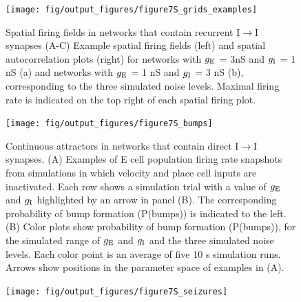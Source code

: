 \documentclass[a4paper,12pt]{article}
\newcommand{\ssc}[3]{\ensuremath{#1_{\text{#2}_{\text{#3}}}}}
\newcommand{\gE      }{\ssc{g}      {\scriptsize{E}}{}}
\newcommand{\gI      }{\ssc{g}      {\scriptsize{I}}{}}
\begin{document}
\setcounter{figure}{0}
\renewcommand{\figurename}{Figure 7 - figure supplement}


\begin{figure}[p]
    \internallinenumbers
    \centering
        \texttt{[image: fig/output\_figures/figure7S\_grids\_examples]}
    \caption{Spatial firing fields in networks that contain recurrent
    I$\rightarrow$I synapses (A-C) Example spatial firing fields (left) and spatial
    autocorrelation plots (right) for networks with $\gE$ = 3nS and $\gI$ = 1
    nS (a) and networks with $\gE$ = 1 nS and $\gI$ = 3 nS (b), corresponding
    to the three simulated noise levels. Maximal firing rate is indicated on
    the top right of each spatial firing plot.}
\end{figure}

\clearpage

\begin{figure}[p]
    \internallinenumbers
    \centering
        \texttt{[image: fig/output\_figures/figure7S\_bumps]}
    \caption{Continuous attractors in networks that contain direct
    I$\rightarrow$I synapses. (A) Examples of E cell population firing rate
    snapshots from simulations in which velocity and place cell inputs are
    inactivated. Each row shows a simulation trial with a value of $\gE$ and
    $\gI$
    highlighted by an arrow in panel (B). The corresponding probability of bump
    formation (P(bumps)) is indicated to the left.  (B) Color plots show
    probability of bump formation (P(bumps)), for the simulated range of $\gE$ and
    $\gI$ and the three simulated noise levels. Each color point is an average of
    five 10 s simulation runs. Arrows show positions in the parameter space of
    examples in (A).}
\end{figure}

\clearpage

\begin{figure}[p]
    \internallinenumbers
    \centering
        \texttt{[image: fig/output\_figures/figure7S\_seizures]}
\end{figure}

\clearpage
\end{document}
